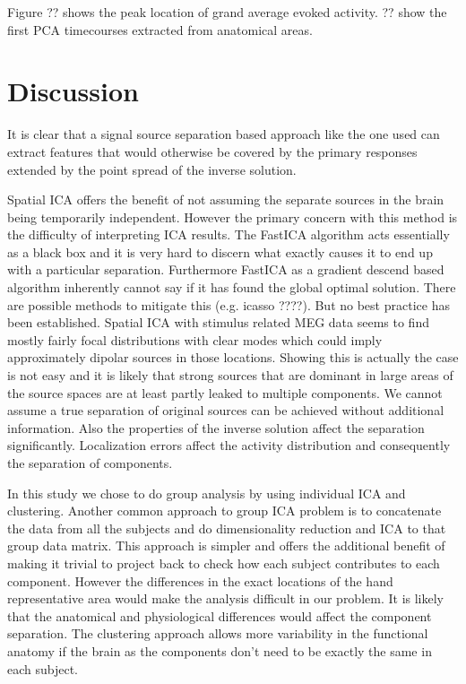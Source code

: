 \documentclass[]{article}
\begin{document}
Figure ?? shows the peak location of grand average evoked activity. ?? show the first PCA timecourses extracted from anatomical areas. 



\section*{Discussion}

It is clear that a signal source separation based approach like the one used can extract features that would otherwise be covered by the primary responses extended by the point spread of the inverse solution. 

Spatial ICA offers the benefit of not assuming the separate sources in the brain being temporarily independent. However the primary concern with this method is the difficulty of interpreting ICA results. The FastICA algorithm acts essentially as a black box and it is very hard to discern what exactly causes it to end up with a particular separation. Furthermore FastICA as a gradient descend based algorithm inherently cannot say if it has found the global optimal solution. There are possible methods to mitigate this (e.g. icasso ????). But no best practice has been established. Spatial ICA with stimulus related MEG data seems to find mostly fairly focal distributions with clear modes which could imply approximately dipolar sources in those locations. Showing this is actually the case is not easy and it is likely that strong sources that are dominant in large areas of the source spaces are at least partly leaked to multiple components. We cannot assume a true separation of original sources can be achieved without additional information. Also the properties of the inverse solution affect the separation significantly. Localization errors affect the activity distribution and consequently the separation of components.

In this study we chose to do group analysis by using individual ICA and clustering. Another common approach to group ICA problem is to concatenate the data from all the subjects and do dimensionality reduction and ICA to that group data matrix. This approach is simpler and offers the additional benefit of making it trivial to project back to check how each subject contributes to each component. However the differences in the exact locations of the hand representative area would make the analysis difficult in our problem. It is likely that the anatomical and physiological differences would affect the component separation. The clustering approach allows more variability in the functional anatomy if the brain as the components don't need to be exactly the same in each subject. 
\end{document}
